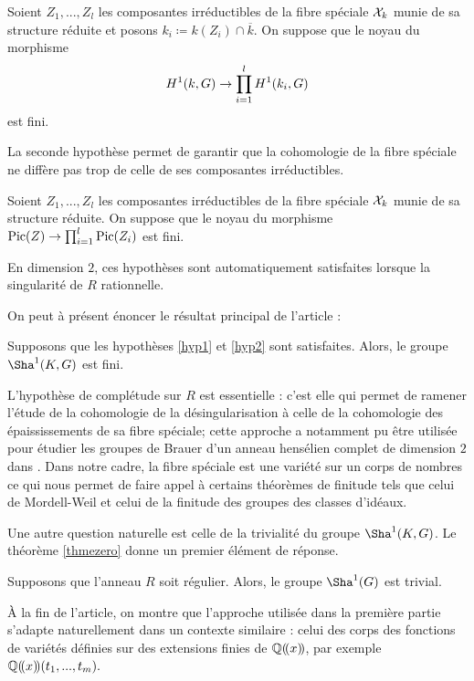 \documentclass[11pt]{article}
\begin{document}
\begin{hypoe}\label{hyp1}
Soient $Z_1,...,Z_l$ les composantes irréductibles de la fibre spéciale $\mathcal{X}_k$ munie de sa structure réduite et posons $k_i \coloneqq k(Z_i) \cap \overline{k}$. On suppose que le noyau du morphisme
$$
H^1(k, G) \rightarrow \prod_{i=1}^l H^1(k_i, G)
$$
est fini.
\end{hypoe}

La seconde hypothèse permet de garantir que la cohomologie de la fibre spéciale ne diffère pas trop de celle de ses composantes irréductibles.
\begin{hypoe}\label{hyp2}
Soient $Z_1,...,Z_l$ les composantes irréductibles de la fibre spéciale $\mathcal{X}_k$ munie de sa structure réduite. On suppose que le noyau du morphisme $\operatorname{Pic}(Z) \rightarrow \prod_{i=1}^l\operatorname{Pic}(Z_i)$ est fini.
\end{hypoe}
En dimension $2$, ces hypothèses sont automatiquement satisfaites lorsque la singularité de $R$ rationnelle. 

On peut à présent énoncer le résultat principal de l'article :

\begin{thme}
     Supposons que les hypothèses \ref{hyp1} et \ref{hyp2} sont satisfaites. Alors, le groupe $\Sha^1(K,G)$ est fini.
\end{thme}

L'hypothèse de complétude sur $R$ est essentielle : c'est elle qui permet de ramener l'étude de la cohomologie de la désingularisation à celle de la cohomologie des épaississements de sa fibre spéciale; cette approche a notamment pu être utilisée pour étudier les groupes de Brauer d'un anneau hensélien complet de dimension $2$ dans \cite{CTOP}. Dans notre cadre, la fibre spéciale est une variété sur un corps de nombres ce qui nous permet de faire appel à certains théorèmes de finitude tels que celui de Mordell-Weil et celui de la finitude des groupes des classes d'idéaux.


Une autre question naturelle est celle de la trivialité du groupe $\Sha^1(K,G)$. Le théorème \ref{thmezero} donne un premier élément de réponse.

\begin{thme}
Supposons que l'anneau $R$ soit régulier. Alors, le groupe $\Sha^1(G)$ est trivial.
\end{thme}

À la fin de l'article, on montre que l'approche utilisée dans la première partie s'adapte naturellement dans un contexte similaire : celui des corps des fonctions de variétés définies sur des extensions finies de $\mathbb{Q}(\!(x)\!)$, par exemple $\mathbb{Q}(\!(x)\!)(t_1,...,t_m).$\\
\end{document}
